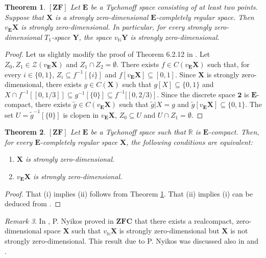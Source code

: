\documentclass[12pt,twoside,leqno]{article}
\theoremstyle{plain}
\newtheorem{theorem}{Theorem}[section]
\theoremstyle{definition}
\theoremstyle{remark}
\newtheorem{remark}[theorem]{Remark}
\begin{document}
\begin{theorem}
	\label{s5:t1}
	$[\mathbf{ZF}]$ Let $\mathbf{E}$ be a Tychonoff space consisting of at least two points. Suppose that $\mathbf{X}$ is a strongly zero-dimensional $\mathbf{E}$-completely regular space. Then $v_{\mathbf{E}}\mathbf{X}$ is strongly zero-dimensional. In particular, for every strongly zero-dimensional $T_1$-space $\mathbf{Y}$, the space $v_{\mathbb{N}}\mathbf{Y}$ is strongly zero-dimensional.
\end{theorem}
\begin{proof}
	Let us slightly modify the proof of Theorem 6.2.12 in \cite{en}. Let $Z_0, Z_1\in\mathcal{Z}(v_{\mathbf{E}}\mathbf{X})$ and $Z_1\cap Z_2=\emptyset$. There exists $f\in C(v_{\mathbf{E}}\mathbf{X})$ such that, for every $i\in\{0, 1\}$,  $Z_i\subseteq f^{-1}[\{i\}]$ and $f[v_{\mathbf{E}}\mathbf{X}]\subseteq [0, 1]$. Since $\mathbf{X}$ is strongly zero-dimensional, there exists $g\in C(\mathbf{X})$ such that $g[X]\subseteq\{0,1\}$ and $X\cap f^{-1}[[0, 1/3]]\subseteq g^{-1}[\{0\}]\subseteq f^{-1}[[0, 2/3)]$. Since the discrete space $\mathbf{2}$ is $\mathbf{E}$-compact, there exists $\tilde{g}\in C(v_{\mathbf{E}}\mathbf{X})$ such that $\tilde{g}|X=g$ and $\tilde{g}[v_{\mathbf{E}}\mathbf{X}]\subseteq\{0, 1\}$. The set $U=\tilde{g}^{-1}[\{0\}]$ is clopen in $v_{\mathbf{E}}\mathbf{X}$, $Z_0\subseteq U$ and $U\cap Z_1=\emptyset$. 
\end{proof}

\begin{theorem}
	\label{s5:t2}
	$[\mathbf{ZF}]$ 
	Let $\mathbf{E}$ be a Tychonoff space such that $\mathbb{R}$ is $\mathbf{E}$-compact.  Then, for every $\mathbf{E}$-completely regular space $\mathbf{X}$,  the following conditions are equivalent:
	\begin{enumerate}
		\item[(i)] $\mathbf{X}$ is strongly zero-dimensional.
		\item[(ii)] $v_{\mathbf{E}}\mathbf{X}$ is strongly zero-dimensional. 
	\end{enumerate}
\end{theorem}
\begin{proof}
	That (i) implies (ii) follows from Theorem \ref{s5:t1}. That (ii) implies (i) can be deduced from \cite[Theorem 6.2.11]{en}.
\end{proof}

\begin{remark}
	\label{s5:r3}
	In \cite{ny}, P. Nyikos proved in $\mathbf{ZFC}$ that there exists a realcompact,  zero-dimensional space $\mathbf{X}$ such that $v_{\mathbb{N}}\mathbf{X}$ is strongly zero-dimensional but $\mathbf{X}$ is not strongly zero-dimensional. This result due to P. Nyikos was discussed also in \cite{mr4} and \cite{mr5}.  
\end{remark}
\end{document}
